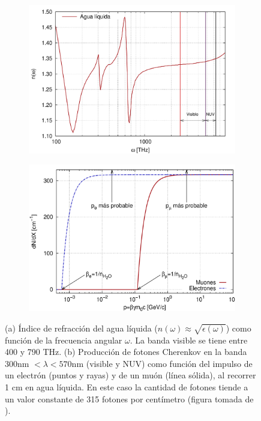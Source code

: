 \documentclass[12pt,oneside,openany,letter]{book}
\begin{document}
\begin{figure}
    \centering
    \begin{subfigure}{0.45\textwidth}
        \includegraphics[width=\textwidth]{asorey1.png}
        \caption{}
        \label{asorey1}
    \end{subfigure}
        \begin{subfigure}{0.45\textwidth}
        \includegraphics[width=\textwidth]{asorey2.png}
        \caption{}
        \label{asorey2}
    \end{subfigure}
   \caption[Índice de refracción del agua líquida como función de la
frecuencia angular y producción de fotones Cherenkov en la banda visible y NUV]{(a) Índice de refracción del agua líquida ($n(\omega)\approx \sqrt{\epsilon(\omega)}$) como función de la
frecuencia angular $\omega$. La banda visible se tiene entre 400 y 790 THz. (b) Producción de fotones Cherenkov en la banda 300nm $< \lambda < 570$nm (visible
y NUV) como función del impulso de un electrón (puntos y rayas) y de un
muón (línea sólida), al recorrer 1 cm en agua líquida. En este caso la cantidad de fotones tiende a un valor constante de 315 fotones por centímetro (figura tomada de \cite{Asorey-phd2012}).}\label{asorey}
\end{figure}
\end{document}
